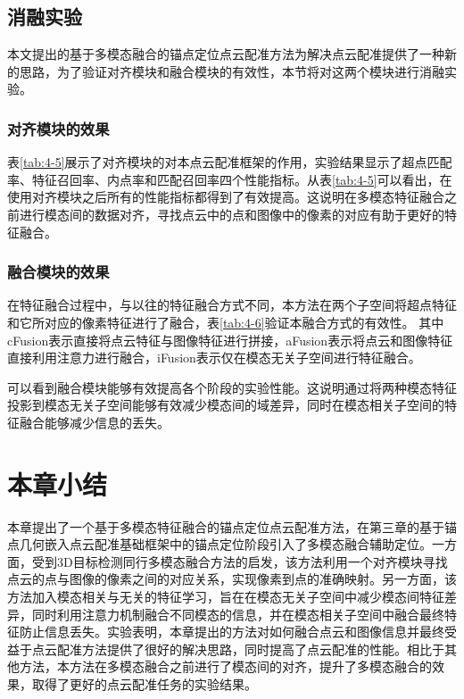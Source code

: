     \subsection{消融实验}
    本文提出的基于多模态融合的锚点定位点云配准方法为解决点云配准提供了一种新的思路，为了验证对齐模块和融合模块的有效性，本节将对这两个模块进行消融实验。

    \subsubsection{对齐模块的效果}表\ref{tab:4-5}展示了对齐模块的对本点云配准框架的作用，实验结果显示了超点匹配率、特征召回率、内点率和匹配召回率四个性能指标。从表\ref{tab:4-5}可以看出，在使用对齐模块之后所有的性能指标都得到了有效提高。这说明在多模态特征融合之前进行模态间的数据对齐，寻找点云中的点和图像中的像素的对应有助于更好的特征融合。
    

    \subsubsection{融合模块的效果}在特征融合过程中，与以往的特征融合方式不同，本方法在两个子空间将超点特征和它所对应的像素特征进行了融合，表\ref{tab:4-6}验证本融合方式的有效性。
    其中cFusion表示直接将点云特征与图像特征进行拼接，aFusion表示将点云和图像特征直接利用注意力进行融合，iFusion表示仅在模态无关子空间进行特征融合。
    
    可以看到融合模块能够有效提高各个阶段的实验性能。这说明通过将两种模态特征投影到模态无关子空间能够有效减少模态间的域差异，同时在模态相关子空间的特征融合能够减少信息的丢失。

    \section{本章小结}
    本章提出了一个基于多模态特征融合的锚点定位点云配准方法，在第三章的基于锚点几何嵌入点云配准基础框架中的锚点定位阶段引入了多模态融合辅助定位。一方面，受到3D目标检测同行多模态融合方法的启发，该方法利用一个对齐模块寻找点云的点与图像的像素之间的对应关系，实现像素到点的准确映射。另一方面，该方法加入模态相关与无关的特征学习，旨在在模态无关子空间中减少模态间特征差异，同时利用注意力机制融合不同模态的信息，并在模态相关子空间中融合最终特征防止信息丢失。实验表明，本章提出的方法对如何融合点云和图像信息并最终受益于点云配准方法提供了很好的解决思路，同时提高了点云配准的性能。相比于其他方法，本方法在多模态融合之前进行了模态间的对齐，提升了多模态融合的效果，取得了更好的点云配准任务的实验结果。